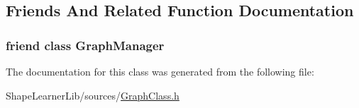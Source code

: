 \subsection{Friends And Related Function Documentation}
\hypertarget{class_graph_class_1_1_access_a4f73c83d7340dc64ca31fa4fdf2ab4b8}{}
\subsubsection[{Graph\+Manager}]{\setlength{\rightskip}{0pt plus 5cm}friend class {\bf Graph\+Manager}\hspace{0.3cm}{\ttfamily [friend]}}\label{class_graph_class_1_1_access_a4f73c83d7340dc64ca31fa4fdf2ab4b8}


The documentation for this class was generated from the following file\+:\begin{DoxyCompactItemize}
\item 
Shape\+Learner\+Lib/sources/\hyperlink{_graph_class_8h}{Graph\+Class.\+h}\end{DoxyCompactItemize}
